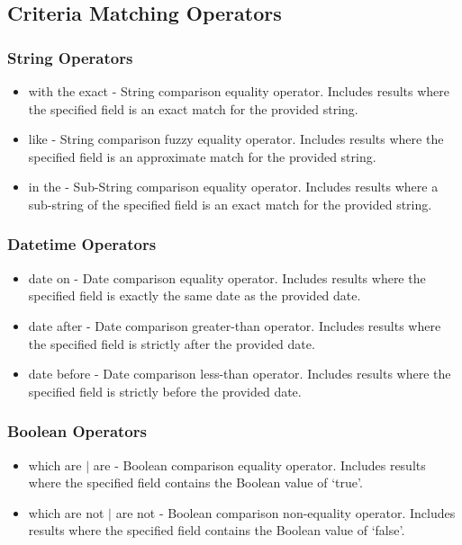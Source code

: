 \subsection{Criteria Matching Operators}
\subsubsection{String Operators}
\label{sub:DerpOperators}
\begin{itemize}
\item with the exact - String comparison equality operator. Includes results where the specified field is an exact match for the provided string.
\item like - String comparison fuzzy equality operator. Includes results where the specified field is an approximate match for the provided string.
\item in the - Sub-String comparison equality operator. Includes results where a sub-string of the specified field is an exact match for the provided string.
\end{itemize}
\subsubsection{Datetime Operators}
\begin{itemize}
\item date on - Date comparison equality operator. Includes results where the specified field is exactly the same date as the provided date.
\item date after - Date comparison greater-than operator. Includes results where the specified field is strictly after the provided date.
\item date before - Date comparison less-than operator. Includes results where the specified field is strictly before the provided date.
\end{itemize}
\subsubsection{Boolean Operators}
\begin{itemize}
\item which are $|$ are - Boolean comparison equality operator. Includes results where the specified field contains the Boolean value of `true'.
\item which are not $|$ are not - Boolean comparison non-equality operator. Includes results where the specified field contains the Boolean value of `false'.
\end{itemize}
